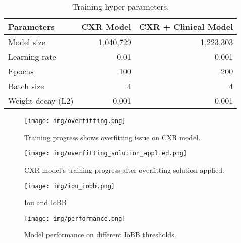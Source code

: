 \documentclass[journal,twoside,web, 11pt]{ieeecolor}
\begin{document}
\begin{table}[h!]
    \centering
    \caption{Training hyper-parameters.}
    \begin{tabular}{|l|r|r|}
    \hline
    Parameters & CXR Model & CXR + Clinical Model \\
    \hline
        Model size &  1,040,729 & 1,223,303  \\
        Learning rate &  0.01 & 0.001 \\
        Epochs & 100 & 200 \\
        Batch size & 4 & 4  \\
        Weight decay (L2) & 0.001  & 0.001\\
    \hline
    \end{tabular}
    \label{tab:hpyer-params}
\end{table}




\begin{figure*}[!h]
    \centering
    \texttt{[image: img/overfitting.png]}
    \caption{Training progress shows overfitting issue on CXR model.}
    \label{fig: overfitting}
\end{figure*}

\begin{figure*}[!h]
    \centering
    \texttt{[image: img/overfitting\_solution\_applied.png]}
    \caption{CXR model's training progress after overfitting solution applied.}
    \label{fig: overfitting_solution_applied}
\end{figure*}

\begin{figure*}[!h]
    \centering
    \texttt{[image: img/iou\_iobb.png]}
    \caption{Iou and IoBB}
    \label{fig: iou_iobb}
\end{figure*}

\begin{figure*}[!h]
    \centering
    \texttt{[image: img/performance.png]}
    \caption{Model performance on different IoBB thresholds.}
    \label{fig: performance}
\end{figure*}
\end{document}
